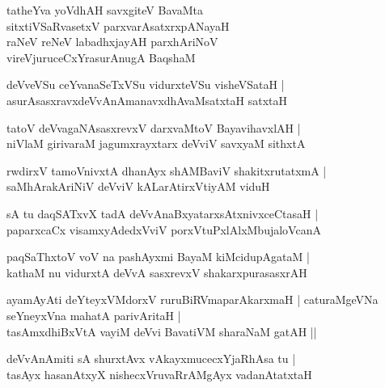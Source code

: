 \begin{shloka}
tatheYva yoVdhAH savxgiteV BavaMta\\sitxtiVSaRvasetxV parxvarAsatxrxpANayaH\\ raNeV reNeV labadhxjayAH parxhAriNoV\\ vireVjuruceCxYrasurAnugA BaqshaM
\end{shloka}

\begin{shloka}
deVveVSu ceYvanaSeTxVSu vidurxteVSu visheVSataH |\\ asurAsasxravxdeVvAnAmanavxdhAvaMsatxtaH satxtaH
\end{shloka}

\begin{shloka}
tatoV deVvagaNAsasxrevxV darxvaMtoV BayavihavxlAH |\\ niVlaM girivaraM jagumxrayxtarx deVviV savxyaM sithxtA
\end{shloka}

\begin{shloka}
rwdirxV tamoVnivxtA dhanAyx shAMBaviV shakitxrutatxmA |\\
saMhArakAriNiV deVviV kALarAtirxVtiyAM viduH
\end{shloka}

\begin{shloka}
sA tu daqSATxvX tadA deVvAnaBxyatarxsAtxnivxceCtasaH |\\ paparxcaCx visamxyAdedxVviV porxVtuPxlAlxMbujaloVcanA
\end{shloka}

\begin{shloka}
paqSaThxtoV voV na pashAyxmi BayaM kiMcidupAgataM |\\ kathaM nu vidurxtA deVvA sasxrevxV shakarxpurasasxrAH 
\end{shloka}

\begin{shloka}
ayamAyAti deYteyxVMdorxV ruruBiRVmaparAkarxmaH |
caturaMgeVNa seYneyxVna mahatA parivAritaH |\\
tasAmxdhiBxVtA vayiM deVvi BavatiVM sharaNaM gatAH ||
\end{shloka}

\begin{shloka}
deVvAnAmiti sA shurxtAvx vAkayxmucecxYjaRhAsa tu |\\ tasAyx hasanAtxyX nishecxVruvaRrAMgAyx vadanAtatxtaH
\end{shloka}

